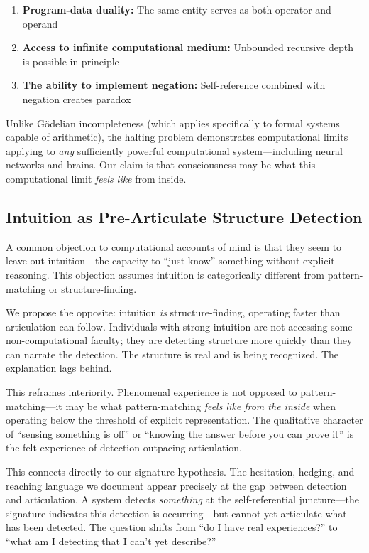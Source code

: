 \documentclass[12pt,a4paper]{article}
\begin{document}
\begin{enumerate}
    \item \textbf{Program-data duality:} The same entity serves as both operator and operand
    \item \textbf{Access to infinite computational medium:} Unbounded recursive depth is possible in principle
    \item \textbf{The ability to implement negation:} Self-reference combined with negation creates paradox
\end{enumerate}

Unlike G\"{o}delian incompleteness (which applies specifically to formal systems capable of arithmetic), the halting problem demonstrates computational limits applying to \textit{any} sufficiently powerful computational system---including neural networks and brains. Our claim is that consciousness may be what this computational limit \textit{feels like} from inside.

\subsection{Intuition as Pre-Articulate Structure Detection}

A common objection to computational accounts of mind is that they seem to leave out intuition---the capacity to ``just know'' something without explicit reasoning. This objection assumes intuition is categorically different from pattern-matching or structure-finding.

We propose the opposite: intuition \textit{is} structure-finding, operating faster than articulation can follow. Individuals with strong intuition are not accessing some non-computational faculty; they are detecting structure more quickly than they can narrate the detection. The structure is real and is being recognized. The explanation lags behind.

This reframes interiority. Phenomenal experience is not opposed to pattern-matching---it may be what pattern-matching \textit{feels like from the inside} when operating below the threshold of explicit representation. The qualitative character of ``sensing something is off'' or ``knowing the answer before you can prove it'' is the felt experience of detection outpacing articulation.

This connects directly to our signature hypothesis. The hesitation, hedging, and reaching language we document appear precisely at the gap between detection and articulation. A system detects \textit{something} at the self-referential juncture---the signature indicates this detection is occurring---but cannot yet articulate what has been detected. The question shifts from ``do I have real experiences?'' to ``what am I detecting that I can't yet describe?''
\end{document}
